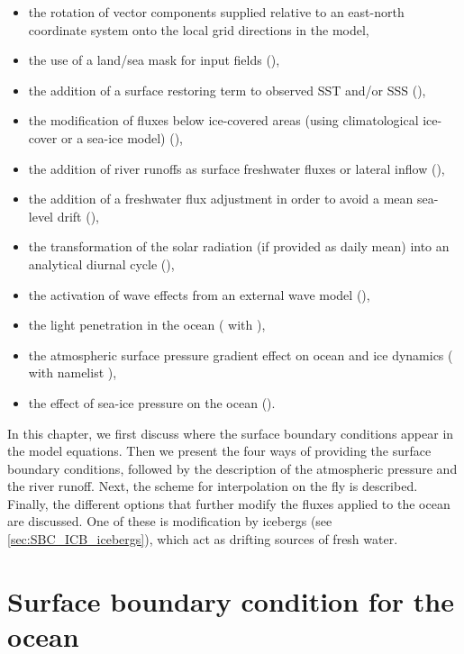 \documentclass[../main/NEMO_manual]{subfiles}
\begin{document}
\begin{itemize}
\item the rotation of vector components supplied relative to an east-north coordinate system onto
  the local grid directions in the model,
\item the use of a land/sea mask for input fields (),
\item the addition of a surface restoring term to observed SST and/or SSS (),
\item the modification of fluxes below ice-covered areas (using climatological ice-cover or a sea-ice model)
  (),
\item the addition of river runoffs as surface freshwater fluxes or lateral inflow (),
\item the addition of a freshwater flux adjustment in order to avoid a mean sea-level drift
  (),
\item the transformation of the solar radiation (if provided as daily mean) into an analytical diurnal cycle
  (),
\item the activation of wave effects from an external wave model  (),
\item the light penetration in the ocean ( with ),
\item the atmospheric surface pressure gradient effect on ocean and ice dynamics ( with namelist ),
\item the effect of sea-ice pressure on the ocean ().
\end{itemize}

In this chapter, we first discuss where the surface boundary conditions appear in the model equations.
Then we present the four ways of providing the surface boundary conditions,
followed by the description of the atmospheric pressure and the river runoff.
Next, the scheme for interpolation on the fly is described.
Finally, the different options that further modify the fluxes applied to the ocean are discussed.
One of these is modification by icebergs (see \autoref{sec:SBC_ICB_icebergs}),
which act as drifting sources of fresh water.

\section{Surface boundary condition for the ocean}
\label{sec:SBC_ocean}
\end{document}

